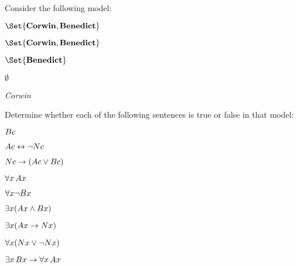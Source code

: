 \begin{practiceproblems}
\problempart
\label{pr.TorF1}
Consider the following model:
\begin{interp}
	\item[\domain] $\Set{\emph{Corwin}, \emph{Benedict}}$
	\item[\denote{A}] $\Set{\emph{Corwin}, \emph{Benedict}}$
	\item[\denote{B}] $\Set{\emph{Benedict}}$
	\item[\denote{N}] $\emptyset$
	\item[\denote{c}] \emph{Corwin}
\end{interp}
Determine whether each of the following sentences is true or false in that model:
\begin{earg}
\item $\mathord{B}c$ \hfill {}
\item $\mathord{A}c \leftrightarrow \neg \mathord{N}c$ \hfill {}
\item $\mathord{N}c \rightarrow (\mathord{A}c \vee \mathord{B}c)$ \hfill {}
\item $\forall x\,\mathord{A}x$ \hfill {}
\item $\forall x \neg \mathord{B}x$ \hfill {}
\item $\exists x(\mathord{A}x \mathbin{\wedge} \mathord{B}x)$ \hfill {}
\item $\exists x(\mathord{A}x \rightarrow \mathord{N}x)$ \hfill {}
\item $\forall x(\mathord{N}x \vee \neg \mathord{N}x)$ \hfill {}
\item $\exists x\,\mathord{B}x \rightarrow \forall x\,\mathord{A}x$ \hfill {}
\end{earg}


\end{practiceproblems}
